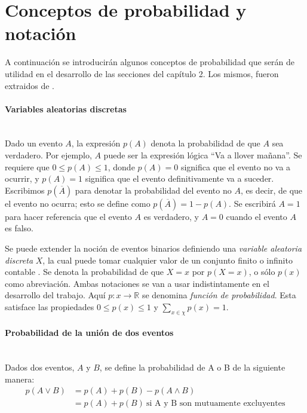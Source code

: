 \appendix
\section{Conceptos de probabilidad y notación}
\label{section:Apendice-A}

	A continuación se introducirán algunos conceptos de probabilidad que serán de utilidad en el desarrollo de las secciones del capítulo 2. Los mismos, fueron extraidos de \cite{Murphy12}.

	\paragraph*{Variables aleatorias discretas} ~\\

		Dado un evento $A$, la expresión $p(A)$ denota la probabilidad de que $A$ sea verdadero. Por ejemplo, $A$ puede ser la expresión lógica ``Va a llover mañana''. Se requiere que $0 \leq p(A) \leq 1$, donde $p(A)=0$ significa que el evento no va a ocurrir, y $p(A)=1$ significa que el evento definitivamente va a suceder. Escribimos $p(\overline{A})$ para denotar la probabilidad del evento no $A$, es decir, de que el evento no ocurra; esto se define como $p(\overline{A})=1-p(A)$. Se escribirá $A=1$ para hacer referencia que el evento $A$ es verdadero, y $A=0$ cuando el evento $A$ es falso.
		
		Se puede extender la noción de eventos binarios definiendo una \textit{variable aleatoria discreta} $X$, la cual puede tomar cualquier valor de un conjunto finito o infinito contable \scalebox{1.4}{$\chi$}. Se denota la probabilidad de que $X=x$ por $p(X=x)$, o sólo $p(x)$ como abreviación. Ambas notaciones se van a usar indistintamente en el desarrollo del trabajo. Aquí $p: x \rightarrow \mathbb{R} $ se denomina \textit{función de probabilidad}. Esta satisface las propiedades $0 \leq p(x) \leq 1$ y $\sum_{x \in \chi}p(x)=1$.
		
	\paragraph*{Probabilidad de la unión de dos eventos} ~\\
		
		Dados dos eventos, $A$ y $B$, se define la probabilidad de A o B de la siguiente manera:
		\begin{align}
			p(A \lor B) &= p(A) + p(B) - p(A \land B) \\
			&= p(A) + p(B) ~\text{si A y B son mutuamente excluyentes}
		\end{align}
		
